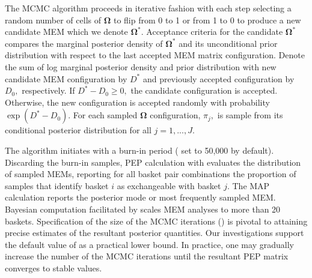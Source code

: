 The MCMC algorithm proceeds in iterative fashion with each step selecting a random number of cells of $\bm{\Omega}$ to flip from 0 to 1 or from 1 to 0 to produce a new candidate MEM which we denote $\bm{\Omega}^*$. Acceptance criteria for the candidate $\bm{\Omega}^*$ compares the marginal posterior density of $\bm{\Omega}^*$ and its unconditional prior distribution with respect to the last accepted MEM matrix configuration. Denote the sum of log marginal posterior density and prior distribution with new candidate MEM configuration by $D^*$ and previously accepted configuration by $D_0,$ respectively. If $D^*-D_0 \geq 0,$ the candidate configuration is accepted. Otherwise, the new configuration is accepted randomly with probability $\exp{(D^*-D_0)}$. For each sampled $\bm{\Omega}$ configuration, $\pi_j,$ is sample from its conditional posterior distribution for all $j=1,...,J.$ 

The algorithm initiates with a burn-in period ( set to 50,000 by default). Discarding the burn-in samples, PEP calculation with  evaluates the distribution of sampled MEMs, reporting for all basket pair combinations the proportion of samples that identify basket $i$ as exchangeable with basket $j.$ The MAP calculation reports the posterior mode or most frequently sampled MEM. Bayesian computation facilitated by  scales MEM analyses to more than 20 baskets. Specification of the size of the MCMC iterations () is pivotal to attaining precise estimates of the resultant posterior quantities. Our investigations support the default value of  as a practical lower bound. In practice, one may gradually increase the number of the MCMC iterations until the resultant PEP matrix  converges to stable values.

